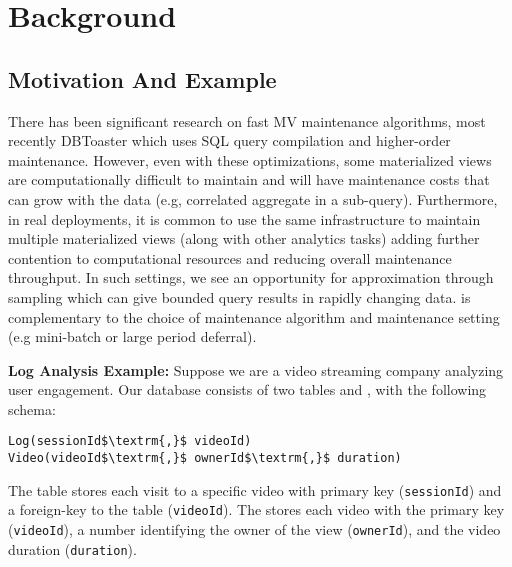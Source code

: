 \section{Background}\label{sec-background}

\subsection{Motivation And Example}\label{subsec-inc}
There has been significant research on fast MV maintenance algorithms, most recently DBToaster \cite{DBLP:journals/vldb/KochAKNNLS14} which uses SQL query compilation and higher-order maintenance.
However, even with these optimizations, some materialized views are computationally difficult to maintain and will have maintenance costs that can grow with the data (e.g, correlated aggregate in a sub-query).
Furthermore, in real deployments, it is common to use the same infrastructure to maintain multiple materialized views (along with other analytics tasks) adding further contention to computational resources and reducing overall maintenance throughput.
In such settings, we see an opportunity for approximation through sampling which can give bounded query results in rapidly changing data.
\svc is complementary to the choice of maintenance algorithm and maintenance setting (e.g mini-batch or large period deferral).

\vspace{0.5em}

\noindent \textbf{Log Analysis Example: } %
Suppose we are a video streaming company analyzing user engagement.
Our database consists of two tables  and , with the following schema:
\begin{lstlisting}[mathescape,basicstyle={\scriptsize}]
Log(sessionId$\textrm{,}$ videoId)
Video(videoId$\textrm{,}$ ownerId$\textrm{,}$ duration)
\end{lstlisting}
The  table stores each visit to a specific video with primary key (\texttt{sessionId}) and a foreign-key to the  table (\texttt{videoId}).
The  stores each video with the primary key (\texttt{videoId}), a number identifying the owner of the view (\texttt{ownerId}), and the video duration (\texttt{duration}).

